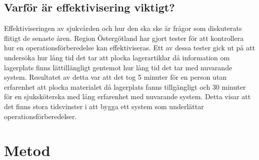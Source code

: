\documentclass{article}
\begin{document}
\subsection{Varför är effektivisering viktigt?}
Effektiviseringen av sjukvården och hur den ska ske är frågor som diskuterats flitigt de senaste åren. Region Östergötland har gjort tester för att kontrollera hur en operationsförberedelse kan effektiviseras. Ett av dessa tester gick ut på att undersöka hur lång tid det tar att plocka lagerartiklar då information om lagerplats finns lättillängligt gentemot hur lång tid det tar med nuvarande system. Resultatet av detta var att det tog 5 minuter för en person utan erfarenhet att plocka materialet då lagerplats fanns tillgängligt och 30 minuter för en sjuksköterska med lång erfarenhet med nuvarande system. Detta visar att det finns stora tidsvinster i att bygga ett system som underlättar operationsförberedelser.



 
\section{Metod}
\end{document}
